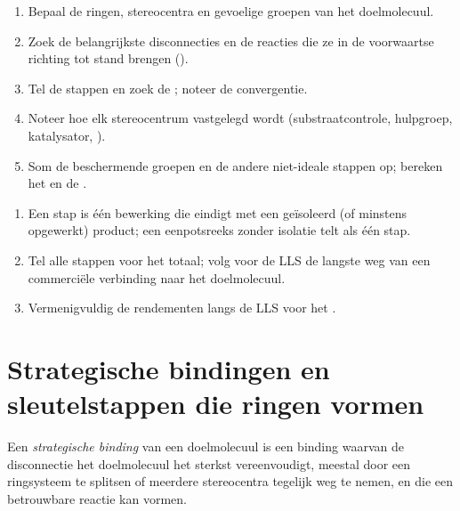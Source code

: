 \begin{method}\label{met:b3:total-synthesis:analyse}
\begin{enumerate}
  \item Bepaal de ringen, stereocentra en gevoelige groepen van het
        doelmolecuul.
  \item Zoek de belangrijkste disconnecties en de reacties die ze in de
        voorwaartse richting tot stand brengen ().
  \item Tel de stappen en zoek de ; noteer de
        convergentie.
  \item Noteer hoe elk stereocentrum vastgelegd wordt (substraatcontrole,
        hulpgroep, katalysator, ).
  \item Som de beschermende groepen en de andere niet-ideale stappen op;
        bereken het  en de .
\end{enumerate}
\end{method}

\begin{method}\label{met:b3:total-synthesis:count}
\begin{enumerate}
  \item Een stap is één bewerking die eindigt met een geïsoleerd (of
        minstens opgewerkt) product; een eenpotsreeks zonder isolatie telt
        als één stap.
  \item Tel alle stappen voor het totaal; volg voor de LLS de langste weg
        van een commerciële verbinding naar het doelmolecuul.
  \item Vermenigvuldig de rendementen langs de LLS voor het
        .
\end{enumerate}
\end{method}

\section{Strategische bindingen en sleutelstappen die ringen vormen}

\begin{definition}\label{def:b3:total-synthesis:strategic-bond}
Een \emph{strategische binding} van een doelmolecuul
is een binding waarvan de disconnectie het doelmolecuul het sterkst
vereenvoudigt, meestal door een ringsysteem te splitsen of meerdere
stereocentra tegelijk weg te nemen, en die een betrouwbare reactie kan
vormen.
\end{definition}

